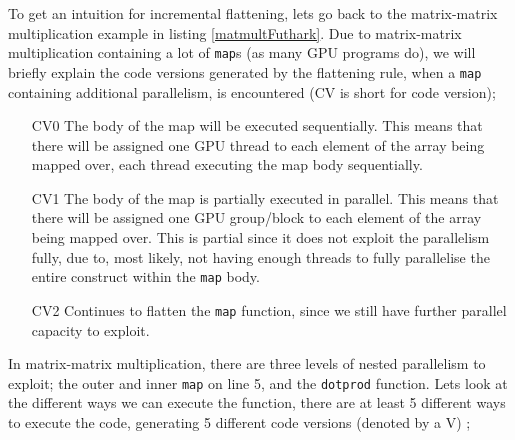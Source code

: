 To get an intuition for incremental flattening, lets go back to the matrix-matrix multiplication example in listing \ref{matmultFuthark}. Due to matrix-matrix multiplication containing a lot of \texttt{map}s (as many GPU programs do), we will briefly explain the code versions generated by the flattening rule, when a \texttt{map} containing additional parallelism, is encountered (CV is short for code version); 
\begin{itemize}
\item[CV0] The body of the map will be executed sequentially. This means that there will be assigned one GPU thread to each element of the array being mapped over, each thread executing the map body sequentially.
\item[CV1] The body of the map is partially executed in parallel. This means that there will be assigned one GPU group/block to each element of the array being mapped over. This is partial since it does not exploit the parallelism fully, due to, most likely, not having enough threads to fully parallelise the entire construct within the \texttt{map} body.
\item[CV2] Continues to flatten the \texttt{map} function, since we still have further parallel capacity to exploit.  
\end{itemize}
\begin{center}
	\centering 
	
	\label{maptree}
\end{center}
In matrix-matrix multiplication, there are three levels of nested parallelism to exploit; the outer and inner \texttt{map} on line 5, and the \texttt{dotprod} function. Lets look at the different ways we can execute the function, there are at least 5 different ways to execute the code, generating 5 different code versions (denoted by a V) \cite{inc-flat};
